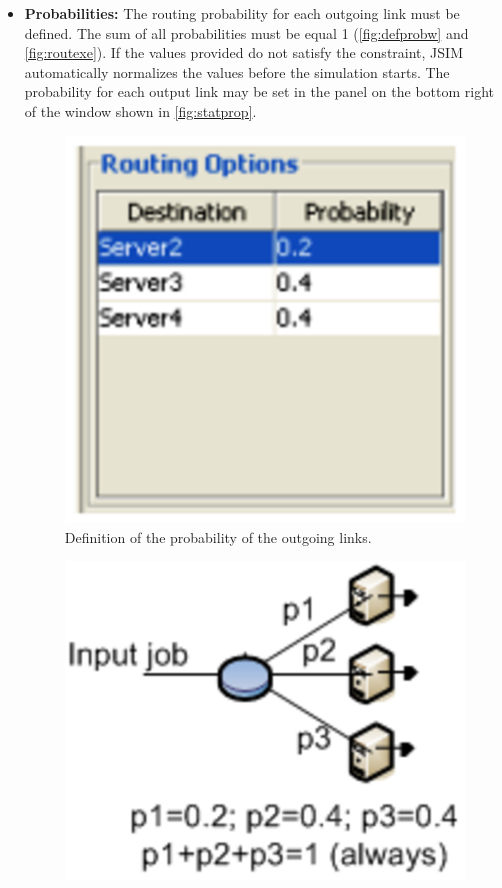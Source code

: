 \begin{itemize}
\item \textbf{Probabilities:} The routing probability for each
outgoing link must be defined. The sum of all probabilities must
be equal 1 (\autoref{fig:defprobw} and \autoref{fig:routexe}). If the
values provided do not satisfy the constraint, JSIM automatically
normalizes the values before the simulation starts. The
probability for each output link may be set in the panel on the
bottom right of the window shown in \autoref{fig:statprop}.
\begin{figure}[h!]
    \begin{center}
        \includegraphics[scale=.5]{img/jsimg/8.9.eps}
    \end{center}
    \caption{Definition of the probability of the outgoing links.}
    \label{fig:defprobw}
\end{figure}
\begin{figure}[h!]
    \begin{center}
        \includegraphics[scale=.5]{img/jsimg/8.10.eps}

\end{center}
\end{figure}
\end{itemize}

